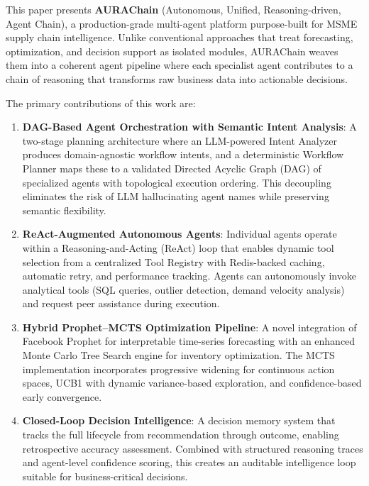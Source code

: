 \documentclass[conference]{IEEEtran}
\begin{document}
This paper presents \textbf{AURAChain} (Autonomous, Unified, Reasoning-driven, Agent Chain), a production-grade multi-agent platform purpose-built for MSME supply chain intelligence. Unlike conventional approaches that treat forecasting, optimization, and decision support as isolated modules, AURAChain weaves them into a coherent agent pipeline where each specialist agent contributes to a chain of reasoning that transforms raw business data into actionable decisions.

The primary contributions of this work are:

\begin{enumerate}
    \item \textbf{DAG-Based Agent Orchestration with Semantic Intent Analysis}: A two-stage planning architecture where an LLM-powered Intent Analyzer produces domain-agnostic workflow intents, and a deterministic Workflow Planner maps these to a validated Directed Acyclic Graph (DAG) of specialized agents with topological execution ordering. This decoupling eliminates the risk of LLM hallucinating agent names while preserving semantic flexibility.
    
    \item \textbf{ReAct-Augmented Autonomous Agents}: Individual agents operate within a Reasoning-and-Acting (ReAct) loop that enables dynamic tool selection from a centralized Tool Registry with Redis-backed caching, automatic retry, and performance tracking. Agents can autonomously invoke analytical tools (SQL queries, outlier detection, demand velocity analysis) and request peer assistance during execution.
    
    \item \textbf{Hybrid Prophet--MCTS Optimization Pipeline}: A novel integration of Facebook Prophet for interpretable time-series forecasting with an enhanced Monte Carlo Tree Search engine for inventory optimization. The MCTS implementation incorporates progressive widening for continuous action spaces, UCB1 with dynamic variance-based exploration, and confidence-based early convergence.
    
    \item \textbf{Closed-Loop Decision Intelligence}: A decision memory system that tracks the full lifecycle from recommendation through outcome, enabling retrospective accuracy assessment. Combined with structured reasoning traces and agent-level confidence scoring, this creates an auditable intelligence loop suitable for business-critical decisions.
\end{enumerate}
\end{document}
